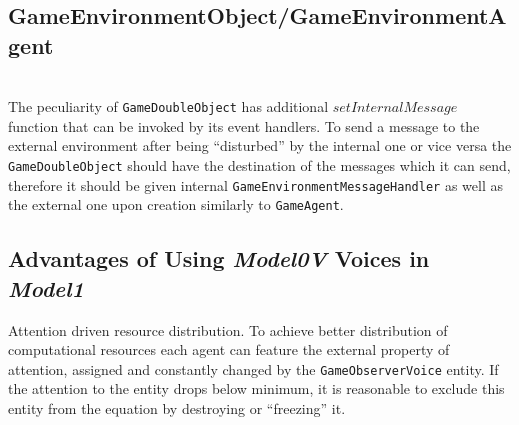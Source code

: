 \subsection{GameEnvironmentObject/GameEnvironmentAgent} \\
The peculiarity of \texttt{GameDoubleObject} has additional $setInternalMessage$ function that can be invoked by its event handlers. To send a message to the external environment after being ``disturbed'' by the internal one or vice versa the \texttt{GameDoubleObject} should have the destination of the messages which it can send, therefore it should be given internal \texttt{GameEnvironmentMessageHandler} as well as the external one upon creation similarly to \texttt{GameAgent}.
\subsection{Advantages of Using \textit{Model0V} Voices in \textit{Model1}}\break
 Attention driven resource distribution.
 To achieve better distribution of computational resources each agent can feature the external property of attention, assigned and constantly changed by the \texttt{GameObserverVoice} entity. If the attention to the entity drops below minimum, it is reasonable to exclude this entity from the equation by destroying or ``freezing'' it. 